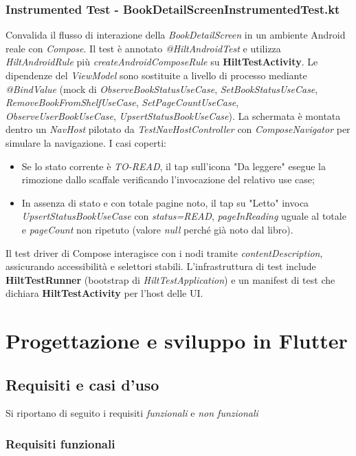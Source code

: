 \documentclass{article}
\begin{document}
\subsubsection{Instrumented Test - BookDetailScreenInstrumentedTest.kt}
Convalida il flusso di interazione della \textit{BookDetailScreen} in un ambiente Android reale con \textit{Compose}. Il test è annotato \textit{@HiltAndroidTest} e utilizza \textit{HiltAndroidRule} più \textit{createAndroidComposeRule} su \textbf{HiltTestActivity}. Le dipendenze del \textit{ViewModel} sono sostituite a livello di processo mediante \textit{@BindValue} (mock di \textit{ObserveBookStatusUseCase}, \textit{SetBookStatusUseCase}, \textit{RemoveBookFromShelfUseCase}, \textit{SetPageCountUseCase}, \textit{ObserveUserBookUseCase}, \textit{UpsertStatusBookUseCase}).
La schermata è montata dentro un \textit{NavHost} pilotato da \textit{TestNavHostController} con \textit{ComposeNavigator} per simulare la navigazione.
I casi coperti:
\begin{itemize}
  \item Se lo stato corrente è \textit{TO-READ}, il tap sull’icona "Da leggere" esegue la rimozione dallo scaffale verificando l’invocazione del relativo use case;
  \item In assenza di stato e con totale pagine noto, il tap su "Letto" invoca \textit{UpsertStatusBookUseCase} con \textit{status=READ}, \textit{pageInReading} uguale al totale e \textit{pageCount} non ripetuto (valore \textit{null} perché già noto dal libro).
\end{itemize}
Il test driver di Compose interagisce con i nodi tramite \textit{contentDescription}, 
assicurando accessibilità e selettori stabili. L’infrastruttura di test include \textbf{HiltTestRunner} (bootstrap di \textit{HiltTestApplication}) 
e un manifest di test che dichiara \textbf{HiltTestActivity} per l’host delle UI.

\section{Progettazione e sviluppo in Flutter}
\subsection{Requisiti e casi d'uso}
Si riportano di seguito i requisiti \textit{funzionali} e \textit{non funzionali}
\subsubsection{Requisiti funzionali}
\end{document}
